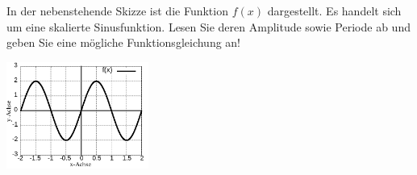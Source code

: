 \item 

\begin{multicols}{2}

In der nebenstehende Skizze ist die Funktion $f(x)$ dargestellt. Es handelt sich um eine skalierte Sinusfunktion. Lesen Sie deren Amplitude sowie Periode ab und geben Sie eine mögliche Funktionsgleichung an!

\columnbreak

\includegraphics[width=0.35\textwidth]{../pool/ex-graph-read-1-img-a.png}

\end{multicols}



